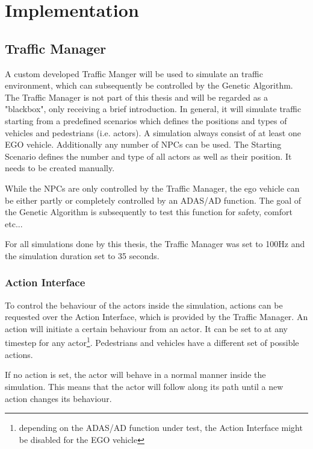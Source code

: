 \chapter{Implementation}
\label{chap:implementation}
\section{Traffic Manager}
A custom developed Traffic Manger will be used to simulate an traffic environment, which can subsequently be controlled by the Genetic Algorithm. The Traffic Manager is not part of this thesis and will be regarded as a "blackbox", only receiving a brief introduction.
In general, it will simulate traffic starting from a predefined scenarios which defines the positions and types of vehicles and pedestrians (i.e. actors). 
A simulation always consist of at least one EGO vehicle. Additionally any number of NPCs can be used. The Starting Scenario defines the number and type of all actors as well as their position. It needs to be created manually.

While the NPCs are only controlled by the Traffic Manager, the ego vehicle can be either partly or completely controlled by an ADAS/AD function. The goal of the Genetic Algorithm is subsequently to test this function for safety, comfort etc...

For all simulations done by this thesis, the Traffic Manager was set to 100Hz and the simulation duration set to 35 seconds.

\subsection{Action Interface}
\label{implementation:action_interface}
To control the behaviour of the actors inside the simulation, actions can be requested over the Action Interface, which is provided by the Traffic Manager. An action will initiate a certain behaviour from an actor. It can be set to at any timestep for any actor\footnote{depending on the ADAS/AD function under test, the Action Interface might be disabled for the EGO vehicle}. Pedestrians and vehicles have a different set of possible actions.


If no action is set, the actor will behave in a normal manner inside the simulation. This means that the actor will follow along its path until a new action changes its behaviour.

